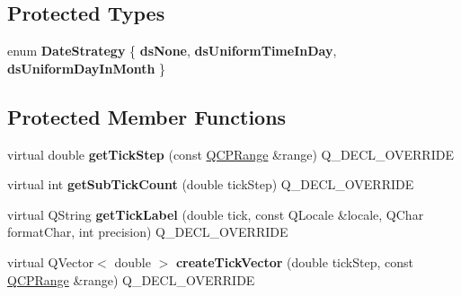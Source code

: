 \subsection*{Protected Types}
\begin{DoxyCompactItemize}
\item 
\mbox{\label{classQCPAxisTickerDateTime_af2c7c60821a6234ca7a172f42ef7f1d8}} 
enum {\bfseries Date\+Strategy} \{ {\bfseries ds\+None}, 
{\bfseries ds\+Uniform\+Time\+In\+Day}, 
{\bfseries ds\+Uniform\+Day\+In\+Month}
 \}
\end{DoxyCompactItemize}
\subsection*{Protected Member Functions}
\begin{DoxyCompactItemize}
\item 
\mbox{\label{classQCPAxisTickerDateTime_a0560c14a3f87bb99ab136aca8321b32a}} 
virtual double {\bfseries get\+Tick\+Step} (const \hyperlink{classQCPRange}{Q\+C\+P\+Range} \&range) Q\+\_\+\+D\+E\+C\+L\+\_\+\+O\+V\+E\+R\+R\+I\+DE
\item 
\mbox{\label{classQCPAxisTickerDateTime_a78dece0d51426a3c310528d413e09193}} 
virtual int {\bfseries get\+Sub\+Tick\+Count} (double tick\+Step) Q\+\_\+\+D\+E\+C\+L\+\_\+\+O\+V\+E\+R\+R\+I\+DE
\item 
\mbox{\label{classQCPAxisTickerDateTime_a4dc6a03f7ea5c619477528a683ed5c18}} 
virtual Q\+String {\bfseries get\+Tick\+Label} (double tick, const Q\+Locale \&locale, Q\+Char format\+Char, int precision) Q\+\_\+\+D\+E\+C\+L\+\_\+\+O\+V\+E\+R\+R\+I\+DE
\item 
\mbox{\label{classQCPAxisTickerDateTime_a44c2c09a303d281801b69226e243047d}} 
virtual Q\+Vector$<$ double $>$ {\bfseries create\+Tick\+Vector} (double tick\+Step, const \hyperlink{classQCPRange}{Q\+C\+P\+Range} \&range) Q\+\_\+\+D\+E\+C\+L\+\_\+\+O\+V\+E\+R\+R\+I\+DE
\end{DoxyCompactItemize}
